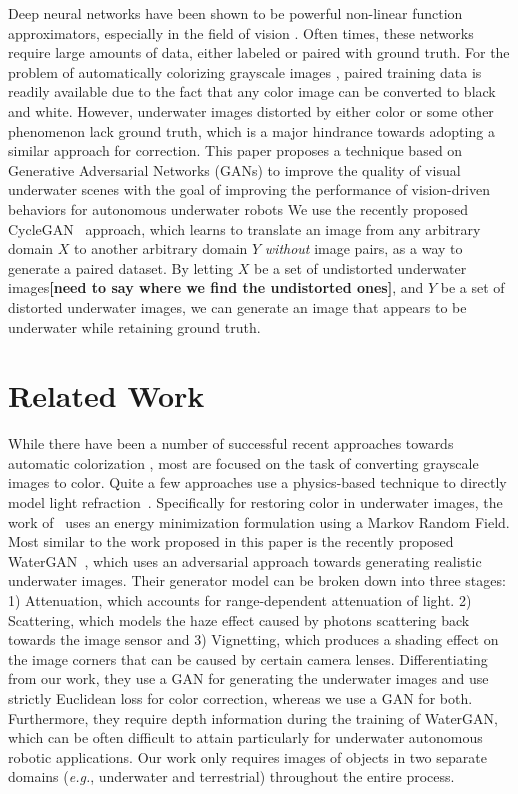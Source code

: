 \documentclass[letterpaper, 10pt, conference]{ieeeconf}
\newcommand{\marginlabel}[1]{\mbox{}\marginpar[\raggedleft\hspace{0pt}{#1}]{
\raggedright\hspace{0pt}{#1}}}
\newcommand{\starnote}[1]{\marginlabel{$\bigstar$}\textbf{[#1]}}
\begin{document}
Deep neural networks have been shown to be powerful non-linear function approximators, especially in the field of vision \cite{krizhevsky2012imagenet}. Often times, these networks require large amounts of data, either labeled or paired with
ground truth. For the problem of automatically colorizing grayscale images \cite{zhang2016colorful}, paired training
data is
readily available due to the fact that any color image can be converted to black and white. However, underwater images distorted by either
color or some other phenomenon lack ground truth, which is a major hindrance towards adopting a similar approach for correction. This paper proposes a technique based on Generative Adversarial Networks (GANs) to improve the quality of visual underwater scenes with the goal of improving the performance of vision-driven behaviors for autonomous underwater robots
We use the recently proposed CycleGAN~\cite{zhu2017unpaired} approach, which learns to translate an image from any arbitrary domain $X$ to another arbitrary domain $Y$ \textit{without} image pairs, as a way to generate a paired dataset.
By letting $X$ be a set of undistorted underwater images\starnote{need to say where we find the undistorted ones}, and
$Y$ be a set of distorted underwater images, we can generate an image that appears to be underwater while retaining
ground truth.

\section{Related Work}

While there have been a number of successful recent approaches towards automatic colorization 
\cite{zhang2016colorful,iizuka2016let}, most are focused on the task of converting grayscale images to color. Quite a few 
approaches use a physics-based technique to directly model light refraction~\cite{jordt2014underwater}. Specifically for
restoring color in underwater images, the work of~\cite{torres2005color} uses an energy minimization formulation using a Markov 
Random Field. Most similar to the work proposed in this paper is the recently proposed WaterGAN~\cite{li2017watergan}, 
which uses an adversarial approach towards generating realistic underwater images. Their generator model can be broken down into 
three stages: 1) Attenuation, which accounts for range-dependent attenuation of light. 2) Scattering, which models the haze 
effect caused by photons scattering back towards the image sensor and 3) Vignetting, which produces a shading effect on the 
image corners that can be caused by certain camera lenses. Differentiating from our work, they use a GAN for generating the 
underwater images and use strictly Euclidean loss for color correction, whereas we use a GAN for both. Furthermore, they require 
depth information during the training of WaterGAN, which can be often difficult to attain particularly for underwater 
autonomous robotic applications. Our work only requires images of objects in two separate domains (\emph{e.g.}, underwater 
and terrestrial) throughout the entire process.
\end{document}
